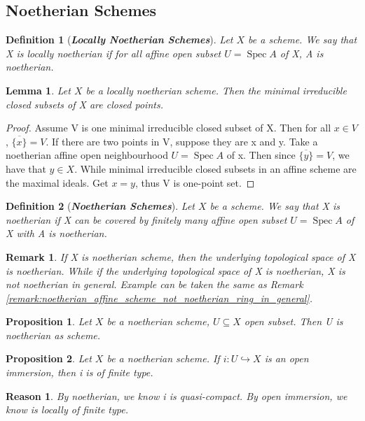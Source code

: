 \documentclass{ctexart}
\newtheorem{definition}{Definition}[section]
\newtheorem{remark}{Remark}[section]
\newtheorem{proposition}{Proposition}[section]
\newtheorem{lemma}{Lemma}[section]
\newtheorem{reason}{Reason}[section]
\newcommand{\spec}{\operatorname{Spec}}
\begin{document}
\subsection{Noetherian Schemes}
\begin{definition}[\textbf{\emph{Locally Noetherian Schemes}}]
    Let $X$ be a scheme.
    We say that X is locally noetherian if for all affine open subset $U = \spec A$ of X, A is noetherian.
\end{definition}
\begin{lemma}
    Let $X$ be a locally noetherian scheme.
    Then the minimal irreducible closed subsets of X are closed points.
    \label{Lemma 3.1}
\end{lemma}
\begin{proof}
    Assume V is one minimal irreducible closed subset of X.
    Then for all $x\in V$, $\overline{\{x\}} = V$.
    If there are two points in V, suppose they are x and y. 
    Take a noetherian affine open neighbourhood $U = \spec A$ of x.
    Then since $\overline{\{y\}} = V$, we have that $y\in X$.
    While minimal irreducible closed subsets in an affine scheme are the maximal ideals.
    Get $x = y$, thus V is one-point set.
\end{proof}
\begin{definition}[\textbf{\emph{Noetherian Schemes}}]
    Let $X$ be a scheme.
    We say that X is noetherian if X can be covered by finitely many affine open subset $U = \spec A$ of X with A is noetherian.
\end{definition}
\begin{remark}
    If X is noetherian scheme, then the underlying topological space of X is noetherian.
    While if the underlying topological space of X is noetherian, X is not noetherian in general.
    Example can be taken the same as Remark \ref{remark:noetherian_affine_scheme_not_noetherian_ring_in_general}.
\end{remark}
\begin{proposition}
    Let $X$ be a noetherian scheme, $U \subseteq X$ open subset.
    Then U is noetherian as scheme.
    \label{Proposition 3.3}
\end{proposition}
\begin{proposition}
    Let $X$ be a noetherian scheme.
    If $i: U \hookrightarrow X$ is an open immersion, then i is of finite type.
    \label{Proposition 3.4}
\end{proposition}
\begin{reason}
    By noetherian, we know i is quasi-compact.
    By open immersion, we know is locally of finite type.
\end{reason}
\end{document}

